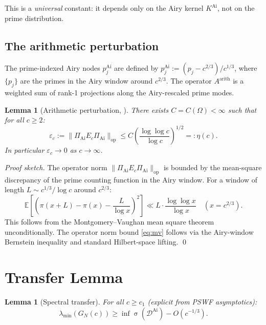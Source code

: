 \documentclass[12pt,a4paper]{amsart}
\newtheorem{lemma}[theorem]{Lemma}
\theoremstyle{definition}
\newcommand{\KAi}{K^{\mathrm{Ai}}}
\newcommand{\DAi}{\mathcal{D}^{\mathrm{Ai}}}
\newcommand{\PAi}{\Pi_{\mathrm{Ai}}}
\newcommand{\GN}{G_N(c)}
\newcommand{\Ec}{E_c}
\newcommand{\norm}[1]{\|#1\|}
\DeclareMathOperator{\spec}{\sigma}
\begin{document}
This is a \emph{universal} constant: it depends only on the Airy kernel
$\KAi$, not on the prime distribution.

\subsection{The arithmetic perturbation}\label{sec:arith}

The prime-indexed Airy nodes $p_j^{\mathrm{Ai}}$ are defined by
$p_j^{\mathrm{Ai}} := (p_j - c^{2/3})/c^{1/3}$,
where $\{p_j\}$ are the primes in the Airy window around $c^{2/3}$.
The operator $A^{\mathrm{arith}}$ is a weighted sum of rank-1 projections
along the Airy-rescaled prime modes.

\begin{lemma}[Arithmetic perturbation, \cite{MV1974}]\label{lem:mv}
There exists $C = C(\Omega) < \infty$ such that for all $c \ge 2$:
\begin{equation}\label{eq:mv}
  \varepsilon_c := \norm{\PAi \Ec \PAi}_{\mathrm{op}}
  \le C \left( \frac{\log\log c}{\log c} \right)^{1/2} =: \eta(c).
\end{equation}
In particular $\varepsilon_c \to 0$ as $c \to \infty$.
\end{lemma}

\begin{proof}[Proof sketch]
The operator norm $\norm{\PAi \Ec \PAi}_{\mathrm{op}}$ is bounded
by the mean-square discrepancy of the prime counting function
in the Airy window.
For a window of length $L \sim c^{1/3}/\log c$ around $c^{2/3}$:
\[
  \mathbb{E}\left[ \left( \pi(x+L) - \pi(x) - \frac{L}{\log x} \right)^2 \right]
  \ll L \cdot \frac{\log\log x}{\log x}
  \quad (x = c^{2/3}).
\]
This follows from the Montgomery--Vaughan mean square theorem
\cite[Theorem~7.3]{MV1974} unconditionally.
The operator norm bound \eqref{eq:mv} follows via the Airy-window
Bernstein inequality and standard Hilbert-space lifting.
\qed
\end{proof}

\section{Transfer Lemma}\label{sec:transfer}

\begin{lemma}[Spectral transfer]\label{lem:transfer}
For all $c \ge c_1$ (explicit from PSWF asymptotics):
\begin{equation}\label{eq:transfer}
  \lambda_{\min}(\GN)
  \ge \inf\spec(\DAi) - O(c^{-1/3}).
\end{equation}
\end{lemma}
\end{document}
